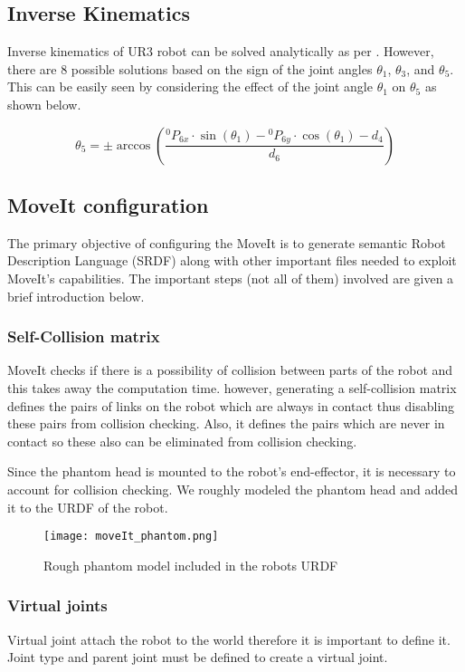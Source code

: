 \subsection{Inverse Kinematics}
Inverse kinematics of UR3 robot can be solved analytically as per \cite{andersen2018kinematics}. However, there are 8 possible solutions based on the sign of the joint angles $\theta_{1}$, $\theta_{3}$, and $\theta_{5}$. This can be easily seen by considering the effect of the joint angle $\theta_{1}$ on $\theta_{5}$ as shown below.

\begin{equation*}
\theta_{5}=\pm \arccos\left(\frac{{}^{0}{P}_{6x} \cdot \sin(\theta_{1})-{}^{0}{P}_{6y} \cdot \cos(\theta_{1})-d_{4}}{d_{6}}\right)
\end{equation*}

\subsection{MoveIt configuration}

The primary objective of configuring the MoveIt is to generate semantic Robot Description Language (SRDF) \cite{SRDF} along with other important files needed to exploit MoveIt's capabilities. The important steps (not all of them) involved are given a brief introduction below.

\subsubsection{Self-Collision matrix} MoveIt checks if there is a possibility of collision between parts of the robot and this takes away the computation time. however, generating a self-collision matrix defines the pairs of links on the robot which are always in contact thus disabling these pairs from collision checking. Also, it defines the pairs which are never in contact so these also can be eliminated from collision checking.  

Since the phantom head is mounted to the robot's end-effector, it is necessary to account for collision checking. We roughly modeled the phantom head and added it to the URDF of the robot.

\begin{figure}[hbt!]
	\centering
	\texttt{[image: moveIt\_phantom.png]}
	\caption{Rough phantom model included in the robots URDF} 
	\label{fig:moveIt_phantom}
\end{figure}

\subsubsection{Virtual joints} Virtual joint attach the robot to the world therefore it is important to define it. Joint type and parent joint must be defined to create a virtual joint.

